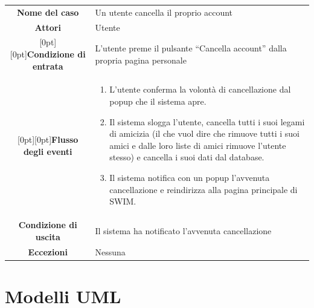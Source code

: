 \documentclass[a4paper,12pt]{article}
\begin{document}
\begin{tabularx}{\textwidth}{|c|X|}
\rowcolor[gray]{.9}\hline  \textbf{Nome del caso} & Un utente cancella il proprio account \\
\rowcolor[gray]{.9}\hline  \textbf{Attori} & Utente \\ 
\rowcolor[gray]{.9}\hline  \raisebox{-1ex}[0pt][0pt]{\textbf{Condizione di entrata}} & L'utente preme il pulsante “Cancella account” dalla propria pagina personale \\
\rowcolor[gray]{.9}\hline  \raisebox{-12ex}[0pt][0pt]{\textbf{Flusso degli eventi}} & 
\begin{enumerate}
\itemsep0em
\item L'utente conferma la volontà di cancellazione dal popup che il sistema apre.
\item Il sistema slogga l'utente, cancella tutti i suoi legami di amicizia (il che vuol dire che rimuove tutti i suoi amici e dalle loro liste di amici rimuove l'utente stesso) e cancella i suoi dati dal database.
\item Il sistema notifica con un popup l'avvenuta cancellazione e reindirizza alla pagina principale di SWIM.
\end{enumerate}
 \\ 
\rowcolor[gray]{.9}\hline  \textbf{Condizione di uscita} & Il sistema ha notificato l'avvenuta cancellazione \\
\rowcolor[gray]{.9}\hline  \textbf{Eccezioni} & Nessuna
\\
\hline 
\end{tabularx}
\clearpage
\vspace*{10cm}
\section{Modelli UML}
\end{document}
